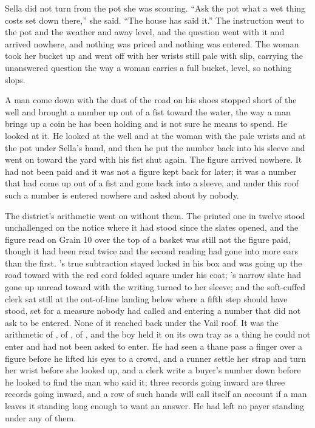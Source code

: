 Sella did not turn from the pot she was scouring. “Ask the pot what a wet thing costs set down there,” she said. “The house has said it.” The instruction went to the pot and the weather and away level, and the question went with it and arrived nowhere, and nothing was priced and nothing was entered. The woman took her bucket up and went off with her wrists still pale with slip, carrying the unanswered question the way a woman carries a full bucket, level, so nothing slops.

A man come down  with the dust of the road on his shoes stopped short of the well and brought a number up out of a fist toward the water, the way a man brings up a coin he has been holding and is not sure he means to spend. He looked at it. He looked at the well and at the woman with the pale wrists and at the pot under Sella's hand, and then he put the number back into his sleeve and went on toward the yard with his fist shut again. The figure arrived nowhere. It had not been paid and it was not a figure kept back for later; it was a number that had come up out of a fist and gone back into a sleeve, and under this roof such a number is entered nowhere and asked about by nobody.

The district's arithmetic went on without them. The printed one in twelve stood unchallenged on the notice where it had stood since the slates opened, and the figure read on Grain 10 over the top of a basket was still not the figure paid, though it had been read twice and the second reading had gone into more ears than the first. 's true subtraction stayed locked in his box and was going up the road toward  with the red cord folded square under his coat; 's narrow slate had gone up unread toward  with the writing turned to her sleeve; and the soft-cuffed clerk sat still at the out-of-line landing below  where a fifth step should have stood, set for a measure nobody had called and entering a number that did not ask to be entered. None of it reached back under the Vail roof. It was the arithmetic of , of , of , and the boy held it on its own tray as a thing he could not enter and had not been asked to enter. He had seen a thane pass a finger over a figure before he lifted his eyes to a crowd, and a runner settle her strap and turn her wrist before she looked up, and a clerk write a buyer's number down before he looked to find the man who said it; three records going inward are three records going inward, and a row of such hands will call itself an account if a man leaves it standing long enough to want an answer. He had left no payer standing under any of them.

